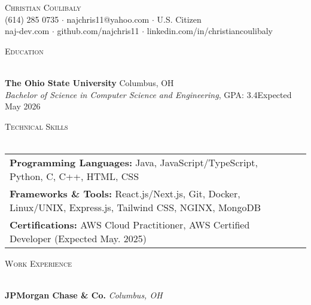 \documentclass[letterpaper]{article}
\newcommand{\lineunder} {
    \vspace*{-8pt} \\
    \hspace*{-18pt} \hrulefill \\
}
\newcommand{\header} [1] {
    {\hspace*{-18pt}\vspace*{6pt} \textsc{#1}}
    \vspace*{-6pt} \lineunder
}
\begin{document}
\vspace*{-40pt}

\vspace*{-10pt}
\begin{center}
	{\Huge \scshape {Christian Coulibaly}}\\
	(614) 285 0735 $\cdot$ najchris11@yahoo.com $\cdot$ U.S. Citizen \\
    naj-dev.com $\cdot$ github.com/najchris11 $\cdot$ linkedin.com/in/christiancoulibaly\\
\end{center}

\header{Education}
\vspace{1mm}

    \textbf{The Ohio State University} \hfill Columbus, OH\\
    \textit{Bachelor of Science in Computer Science and Engineering}, GPA: 3.4\hfill \hfill Expected May 2026\\
    \vspace{2mm}


\header{Technical Skills}
\vspace{1.5mm}
\hspace{-3mm}
\begin{tabular}{ l l }

    \textbf{Programming Languages:} Java, JavaScript/TypeScript, Python, C, C++, HTML, CSS \\

    \textbf{Frameworks \& Tools:} React.js/Next.js, Git, Docker, Linux/UNIX, Express.js, Tailwind CSS, NGINX, MongoDB  \\

    \textbf{Certifications:} AWS Cloud Practitioner, AWS Certified Developer (Expected May. 2025)  \\

\end{tabular}
\vspace{2mm}

\header{Work Experience}
\vspace{1mm}

    \textbf{JPMorgan Chase \& Co.} \hfill \textsl{Columbus, OH}\\
    
\end{document}
